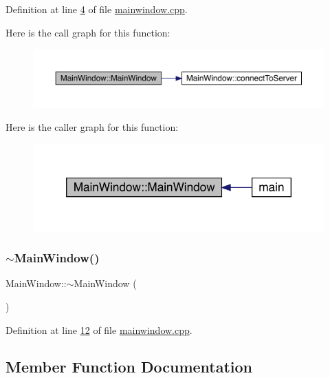 Definition at line \hyperlink{a00080_source_l00004}{4} of file \hyperlink{a00080_source}{mainwindow.\+cpp}.

Here is the call graph for this function\+:
\nopagebreak
\begin{figure}[H]
\begin{center}
\leavevmode
\includegraphics[width=350pt]{dd/d4c/a00177_a8b244be8b7b7db1b08de2a2acb9409db_cgraph}
\end{center}
\end{figure}
Here is the caller graph for this function\+:
\nopagebreak
\begin{figure}[H]
\begin{center}
\leavevmode
\includegraphics[width=346pt]{dd/d4c/a00177_a8b244be8b7b7db1b08de2a2acb9409db_icgraph}
\end{center}
\end{figure}
\mbox{\label{a00177_ae98d00a93bc118200eeef9f9bba1dba7}} 
\subsubsection{\texorpdfstring{$\sim$\+Main\+Window()}{~MainWindow()}}
{\footnotesize\ttfamily Main\+Window\+::$\sim$\+Main\+Window (\begin{DoxyParamCaption}{ }\end{DoxyParamCaption})}



Definition at line \hyperlink{a00080_source_l00012}{12} of file \hyperlink{a00080_source}{mainwindow.\+cpp}.



\subsection{Member Function Documentation}
\mbox{\label{a00177_abfedef9edae209df536e8c1c7cf0e7ae}} 
